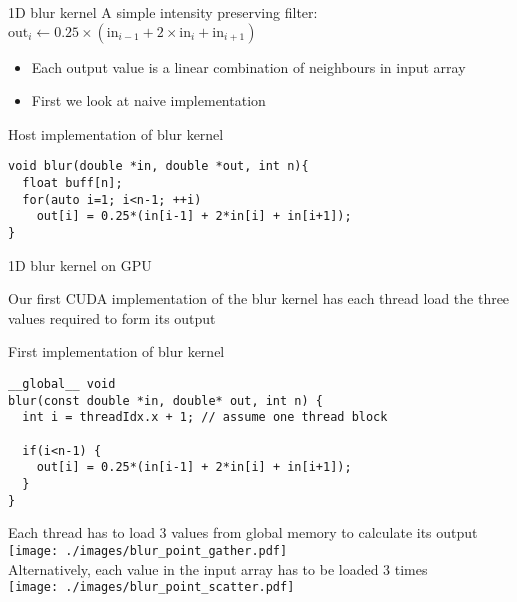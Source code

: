 \documentclass[aspectratio=43]{beamer}
\begin{document}
\begin{frame}[fragile]{1D blur kernel}
    A simple intensity preserving filter:
    \centering $\text{out}_i \leftarrow 0.25\times(\text{in}_{i-1}+2\times\text{in}_i+\text{in}_{i+1})$
    \begin{itemize}
        \item Each output value is a linear combination of neighbours in input array
        \item First we look at naive implementation
    \end{itemize}

    \begin{code}{Host implementation of blur kernel}
        \begin{lstlisting}[style=boxcudatiny]
void blur(double *in, double *out, int n){
  float buff[n];
  for(auto i=1; i<n-1; ++i)
    out[i] = 0.25*(in[i-1] + 2*in[i] + in[i+1]);
}
        \end{lstlisting}
    \end{code}

\end{frame}

\begin{frame}[fragile]{1D blur kernel on GPU}
    \begin{center}
        Our first CUDA implementation of the blur kernel has each thread load the three values required to form its output
    \end{center}
    \begin{code}{First implementation of blur kernel}
        \begin{lstlisting}[style=boxcudatiny]
__global__ void
blur(const double *in, double* out, int n) {
  int i = threadIdx.x + 1; // assume one thread block

  if(i<n-1) {
    out[i] = 0.25*(in[i-1] + 2*in[i] + in[i+1]);
  }
}
        \end{lstlisting}
    \end{code}

\end{frame}

\begin{frame}[fragile]{}
    \centering
    Each thread has to load 3 values from global memory to calculate its output \\
    \texttt{[image: ./images/blur\_point\_gather.pdf]} \\
    Alternatively, each value in the input array has to be loaded 3 times \\
    \texttt{[image: ./images/blur\_point\_scatter.pdf]} \\
\end{frame}
\end{document}

